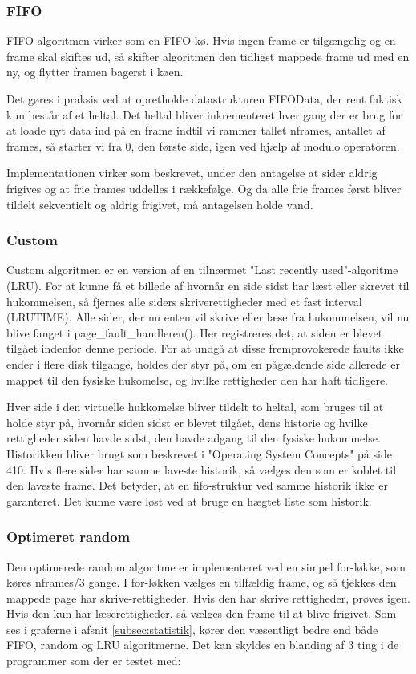 \subsubsection{FIFO}
FIFO algoritmen virker som en FIFO kø. Hvis ingen frame er tilgængelig og en frame skal skiftes ud, så skifter algoritmen den tidligst mappede frame ud med en ny, og flytter framen bagerst i køen.

Det gøres i praksis ved at opretholde datastrukturen FIFOData, der rent faktisk kun består af et heltal. Det heltal bliver inkrementeret hver gang der er brug for at loade nyt data ind på en frame indtil vi rammer tallet nframes, antallet af frames, så starter vi fra 0, den første side, igen ved hjælp af modulo operatoren.

Implementationen virker som beskrevet, under den antagelse at sider aldrig frigives og at frie frames uddelles i rækkefølge. Og da alle frie frames først bliver tildelt sekventielt og aldrig frigivet, må antagelsen holde vand.


\subsubsection{Custom}
\label{subsubsec:custom}
Custom algoritmen er en version af en tilnærmet "Last recently used"-algoritme (LRU). For at kunne få et billede af hvornår en side sidst har læst eller skrevet til hukommelsen, så fjernes alle siders skriverettigheder med et fast interval (LRUTIME). Alle sider, der nu enten vil skrive eller læse fra hukommelsen, vil nu blive fanget i page\_fault\_handleren(). Her registreres det, at siden er blevet tilgået indenfor denne periode. For at undgå at disse fremprovokerede faults ikke ender i flere disk tilgange, holdes der styr på, om en pågældende side allerede er mappet til den fysiske hukomelse, og hvilke rettigheder den har haft tidligere.

Hver side i den virtuelle hukkomelse bliver tildelt to heltal, som bruges til at holde styr på, hvornår siden sidst er blevet tilgået, dens historie og hvilke rettigheder siden havde sidst, den havde adgang til den fysiske hukommelse. Historikken bliver brugt som beskrevet i "Operating System Concepts" på side 410. Hvis flere sider har samme laveste historik, så vælges den som er koblet til den laveste frame. Det betyder, at en fifo-struktur ved samme historik ikke er garanteret. Det kunne være løst ved at bruge en hægtet liste som historik.

\subsubsection{Optimeret random}
Den optimerede random algoritme er implementeret ved en simpel for-løkke, som køres nframes/3 gange. I for-løkken vælges en tilfældig frame, og så tjekkes den mappede page har skrive-rettigheder. Hvis den har skrive rettigheder, prøves igen. Hvis den kun har læserettigheder, så vælges den frame til at blive frigivet. 
Som ses i graferne i afsnit \ref{subsec:statistik}, kører den væsentligt bedre end både FIFO, random og LRU algoritmerne. Det kan skyldes en blanding af 3 ting i de programmer som der er testet med: 

